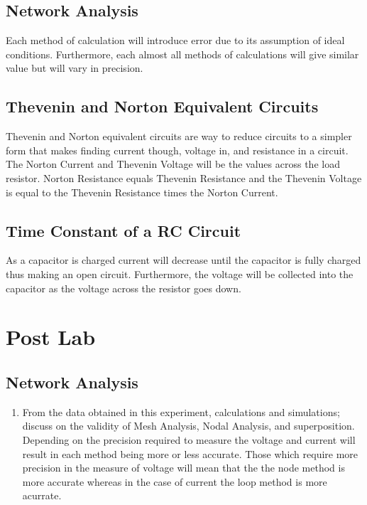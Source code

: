 \documentclass[a4paper]{article}
\begin{document}
\subsection{Network Analysis}

Each method of calculation will introduce error due to its assumption of ideal conditions. Furthermore, each almost all methods of calculations
will give similar value but will vary in precision.

\subsection{Thevenin and Norton Equivalent Circuits}

Thevenin and Norton equivalent circuits are way to reduce circuits to a simpler form that makes finding current though, voltage in, and resistance in a circuit. The Norton Current and Thevenin Voltage
will be the values across the load resistor. Norton Resistance equals Thevenin Resistance and the Thevenin Voltage is equal to the Thevenin Resistance times the Norton Current.  

\subsection{Time Constant of a RC Circuit}

As a capacitor is charged current will decrease until the capacitor is fully charged thus making an open circuit. Furthermore, the voltage will be collected into the capacitor as the voltage across the resistor goes down.

\pagebreak
\section{Post Lab}

\subsection{Network Analysis}

\begin{enumerate}
    \item From the data obtained in this experiment, calculations and simulations; discuss on the validity of Mesh Analysis, Nodal Analysis, and superposition.\\
    Depending on the precision required to measure the voltage and current will result in each method being more or less accurate. Those which require more precision in the measure of voltage will mean that the 
    the node method is more accurate whereas in the case of current the loop method is more acurrate.
\end{enumerate}
    
\end{document}
